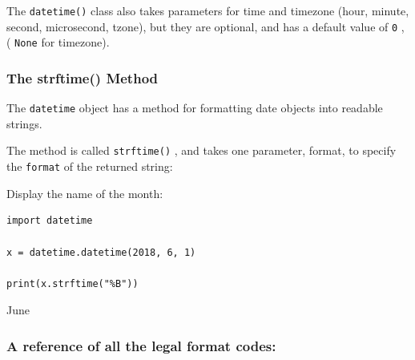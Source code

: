 \documentclass[12pt,a4paper]{article}
\newcommand{\code}[1]{%
	\colorbox{backcolour}{\lstinline{#1}}%
}
\begin{document}
The \code{datetime()} class also takes parameters for time and timezone
(hour, minute, second, microsecond, tzone), but they are optional, and has
a default value of \code{0}, (\code{None} for timezone).
\subsubsection{The strftime() Method}

The \code{datetime} object has a method for formatting date objects into
readable strings.

The method is called \code{strftime()}, and takes one parameter, format,
to specify the \code{format} of the returned string:

\begin{ebox}
Display the name of the month:
	\begin{lstlisting}
import datetime

x = datetime.datetime(2018, 6, 1)

print(x.strftime("%B"))
	\end{lstlisting}
\tcblower
	\begin{vercode}
June
	\end{vercode}
\end{ebox}

\vfill\newpage
\subsubsection*{A reference of all the legal format codes:}
\end{document}
